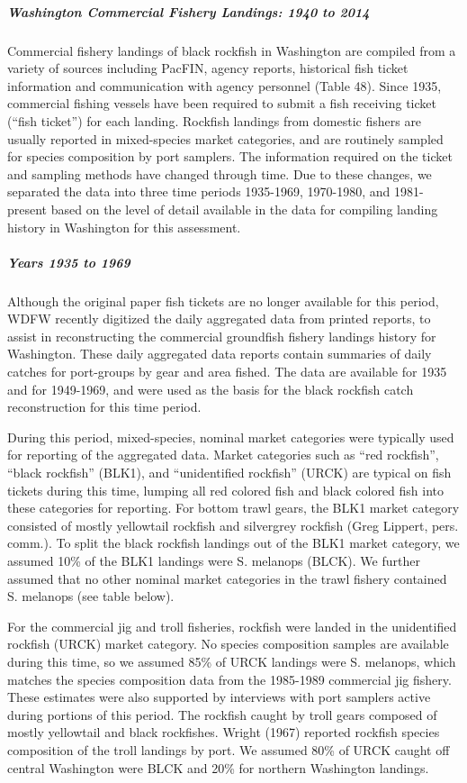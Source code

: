 \documentclass[11pt,
  english,
  letterpaper,
]{article}
\begin{document}
\hypertarget{washington-commercial-fishery-landings-1940-to-2014}{%
\subparagraph{Washington Commercial Fishery Landings: 1940 to 2014}\label{washington-commercial-fishery-landings-1940-to-2014}}

Commercial fishery landings of black rockfish in Washington are compiled from a variety of sources including PacFIN, agency reports, historical fish ticket information and communication with agency personnel (Table 48). Since 1935, commercial fishing vessels have been required to submit a fish receiving ticket (``fish ticket'') for each landing. Rockfish landings from domestic fishers are usually reported in mixed-species market categories, and are routinely sampled for species composition by port samplers. The information required on the ticket and sampling methods have changed through time. Due to these changes, we separated the data into three time periods 1935-1969, 1970-1980, and 1981-present based on the level of detail available in the data for compiling landing history in Washington for this assessment.

\hypertarget{years-1935-to-1969}{%
\subparagraph{Years 1935 to 1969}\label{years-1935-to-1969}}

Although the original paper fish tickets are no longer available for this period, WDFW recently digitized the daily aggregated data from printed reports, to assist in reconstructing the commercial groundfish fishery landings history for Washington. These daily aggregated data reports contain summaries of daily catches for port-groups by gear and area fished. The data are available for 1935 and for 1949-1969, and were used as the basis for the black rockfish catch reconstruction for this time period.

During this period, mixed-species, nominal market categories were typically used for reporting of the aggregated data. Market categories such as ``red rockfish'', ``black rockfish'' (BLK1), and ``unidentified rockfish'' (URCK) are typical on fish tickets during this time, lumping all red colored fish and black colored fish into these categories for reporting. For bottom trawl gears, the BLK1 market category consisted of mostly yellowtail rockfish and silvergrey rockfish (Greg Lippert, pers. comm.). To split the black rockfish landings out of the BLK1 market category, we assumed 10\% of the BLK1 landings were S. melanops (BLCK). We further assumed that no other nominal market categories in the trawl fishery contained S. melanops (see table below).

For the commercial jig and troll fisheries, rockfish were landed in the unidentified rockfish (URCK) market category. No species composition samples are available during this time, so we assumed 85\% of URCK landings were S. melanops, which matches the species composition data from the 1985-1989 commercial jig fishery. These estimates were also supported by interviews with port samplers active during portions of this period. The rockfish caught by troll gears composed of mostly yellowtail and black rockfishes. Wright (1967) reported rockfish species composition of the troll landings by port. We assumed 80\% of URCK caught off central Washington were BLCK and 20\% for northern Washington landings.
\end{document}
